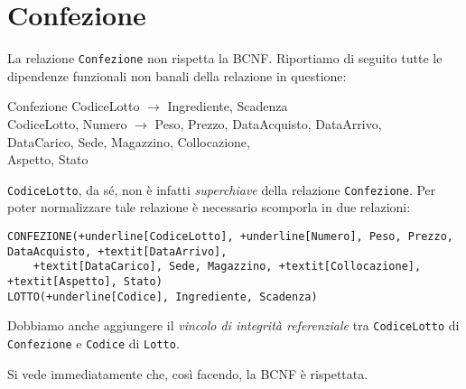 \section{Confezione}\label{sec:confezione}
La relazione {\tt Confezione} non rispetta la BCNF. Riportiamo di seguito tutte
le dipendenze funzionali non banali della relazione in questione:
\begin{funcdep}{Confezione}
    CodiceLotto $\to$ Ingrediente, Scadenza\\
    CodiceLotto, Numero $\to$ Peso, Prezzo, DataAcquisto, DataArrivo,\\
        \indent\indent\indent\indent\indent DataCarico, Sede, Magazzino, Collocazione,\\
        \indent\indent\indent\indent\indent Aspetto, Stato
\end{funcdep}

\noindent\texttt{CodiceLotto}, da sé, non è infatti {\it superchiave} della relazione {\tt Confezione}.
Per poter normalizzare tale relazione è necessario scomporla in due relazioni:

\begin{Verbatim}[commandchars=+\[\]]
CONFEZIONE(+underline[CodiceLotto], +underline[Numero], Peso, Prezzo, DataAcquisto, +textit[DataArrivo],
    +textit[DataCarico], Sede, Magazzino, +textit[Collocazione], +textit[Aspetto], Stato)
LOTTO(+underline[Codice], Ingrediente, Scadenza)
\end{Verbatim}
Dobbiamo anche aggiungere il {\it vincolo di integrità referenziale} tra {\tt CodiceLotto}
di {\tt Confezione} e {\tt Codice} di {\tt Lotto}.

\vspace{10pt}
\noindent Si vede immediatamente che, così facendo, la BCNF è rispettata.
